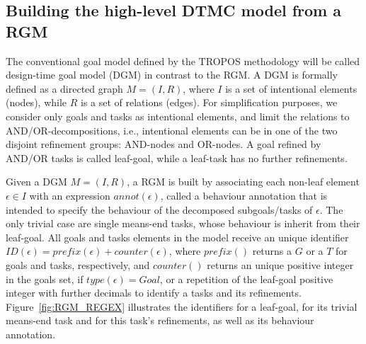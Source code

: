 




\subsection{Building the high-level DTMC model from a RGM}


The conventional goal model defined by the TROPOS methodology will be called design-time goal model (DGM) in contrast to the RGM. A DGM is formally defined as a directed graph $M = (I, R)$, where $I$ is a set of intentional elements (nodes), while $R$ is a set of relations (edges). For simplification purposes, we consider only goals and tasks as intentional elements, and limit the relations to AND/OR-decompositions, i.e., intentional elements can be in one of the two disjoint refinement groups: AND-nodes and OR-nodes. A goal refined by AND/OR tasks is called leaf-goal, while a leaf-task has no further refinements.


Given a DGM $M = (I, R)$, a RGM is built by associating each non-leaf element $\epsilon \in I$ with an expression $annot(\epsilon)$, called a behaviour annotation that is intended to specify the behaviour of the decomposed subgoals/tasks of $\epsilon$. The only trivial case are single means-end tasks, whose behaviour is inherit from their leaf-goal. All goals and tasks elements in the model receive an unique identifier $ID(\epsilon)=prefix(\epsilon) + counter(\epsilon)$, where $prefix()$ returns a $G$ or a $T$ for goals and tasks, respectively, and $counter()$ returns an unique positive integer in the goals set, if $type(\epsilon)=Goal$, or a repetition of the leaf-goal positive integer with further decimals to identify a tasks and its refinements. Figure~\ref{fig:RGM_REGEX} illustrates the identifiers for a leaf-goal, for its trivial means-end task and for this task's refinements, as well as its behaviour annotation.

